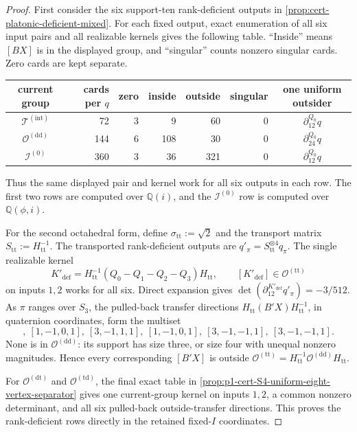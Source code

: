 \documentclass[11pt,letterpaper,onecolumn]{article}
\theoremstyle{plain}
\theoremstyle{definition}
\theoremstyle{remark}
\newcommand{\TetInt}{{\mathcal T^{(\mathrm{int})}}}
\newcommand{\OctDD}{{\mathcal O^{(\mathrm{dd})}}}
\newcommand{\OctTT}{{\mathcal O^{(\mathrm{tt})}}}
\newcommand{\OctDT}{{\mathcal O^{(\mathrm{dt})}}}
\newcommand{\OctTD}{{\mathcal O^{(\mathrm{td})}}}
\newcommand{\IcoZero}{{\mathcal I^{(0)}}}
\begin{document}
\begin{proof}
First consider the six support-ten rank-deficient outputs in
\cref{prop:cert-platonic-deficient-mixed}.  For each fixed output, exact
enumeration of all six input pairs and all realizable kernels gives the following
table.  ``Inside'' means \([BX]\) is in the displayed group, and
``singular'' counts nonzero singular cards. Zero cards are kept separate.
\begin{center}
\normalsize
\setlength{\tabcolsep}{4pt}
\begin{tabular}{crrrrrc}
\toprule
current group&cards per \(q\)&zero&inside&outside&singular&one uniform outsider\\
\midrule
\(\TetInt\)&72&3&9&60&0&\(\partial_{12}^{Q_0}q\)\\
\(\OctDD\)&144&6&108&30&0&\(\partial_{24}^{Q_0}q\)\\
\(\IcoZero\)&360&3&36&321&0&\(\partial_{12}^{Q_0}q\)\\
\bottomrule
\end{tabular}
\end{center}
Thus the same displayed pair and kernel work for all six outputs in each
row.  The first two rows are computed over \(\mathbb Q(i)\), and the
\(\IcoZero\) row is computed over \(\mathbb Q(\phi,i)\).

For the second octahedral form, define
\(\sigma_{\mathrm{tt}}:=\sqrt2\) and the transport matrix
\(S_{\mathrm{tt}}:=H_{\mathrm{tt}}^{-1}\).  The transported rank-deficient outputs
are \(q'_\pi=S_{\mathrm{tt}}^{\otimes4}q_\pi\).  The single realizable
kernel
\hypertarget{eq:cert-Oprime-deficient-kernel}{}
\begin{equation*}
 K'_{\mathrm{def}}
 =H_{\mathrm{tt}}^{-1}(Q_0-Q_1-Q_2-Q_3)H_{\mathrm{tt}},
 \qquad [K'_{\mathrm{def}}]\in\OctTT
\end{equation*}
on inputs \(1,2\) works for all six.  Direct expansion gives
\(\det(\partial_{12}^{K'_{\mathrm{def}}}q'_\pi)=-3/512\).  As
\(\pi\) ranges over \(S_3\), the pulled-back transfer directions
\(H_{\mathrm{tt}}(B'X)H_{\mathrm{tt}}^{-1}\), in quaternion coordinates,
form the multiset
\begin{equation*}
 [3,-1,1,1],\ [1,-1,0,1],\ [3,-1,1,1],\
 [1,-1,0,1],\ [3,-1,-1,1],\ [3,-1,-1,1].
\end{equation*}
None is in \(\OctDD\): its support has size three, or size four with
unequal nonzero magnitudes.  Hence every corresponding \([B'X]\) is outside
\(\OctTT=H_{\mathrm{tt}}^{-1}\OctDD H_{\mathrm{tt}}\).

For \(\OctDT\) and \(\OctTD\), the final exact table in
\cref{prop:p1-cert-S4-uniform-eight-vertex-separator} gives one current-group kernel on inputs \(1,2\), a common nonzero determinant, and
all six pulled-back outside-transfer directions.  This proves the rank-deficient
rows directly in the retained fixed-\(I\) coordinates.


\end{proof}
\end{document}
